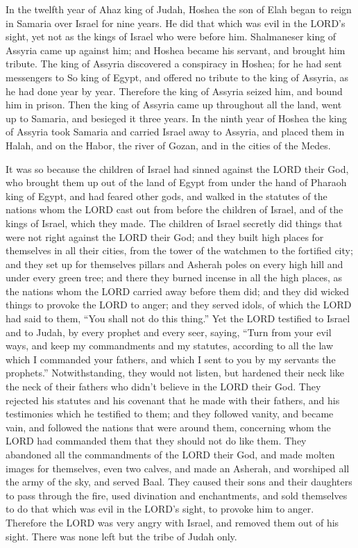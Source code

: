 \mychapter{} \myverse*{}In the twelfth year of Ahaz king of Judah, Hoshea the son of Elah
began to reign in Samaria over Israel for nine years.
\myverse{}He did that which was evil in the LORD’s sight, yet not as the kings of Israel
who were before him.
\myverse{}Shalmaneser king of Assyria came up against him; and Hoshea became his servant,
and brought him tribute.
\myverse{}The king of Assyria discovered a conspiracy in Hoshea; for he had sent messengers
to So king of Egypt, and offered no tribute to the king of Assyria, as he had done year by year. Therefore
the king of Assyria seized him, and bound him in prison.
\myverse{}Then the king of Assyria came up throughout all the land, went up to Samaria,
and besieged it three years.
\myverse{}In the ninth year of Hoshea the king of Assyria took Samaria and carried Israel
away to Assyria, and placed them in Halah, and on the Habor, the river of Gozan, and in the cities of
the Medes.

\myverse{}It was so because the children of Israel had sinned against the
LORD their God, who brought them up out of the land of Egypt from under the hand of Pharaoh king of Egypt,
and had feared other gods,
\myverse{}and walked in the statutes of the nations whom the LORD cast out from before
the children of Israel, and of the kings of Israel, which they made.
\myverse{}The children of Israel secretly did things that were not right against the
LORD their God; and they built high places for themselves in all their cities, from the tower of the watchmen
to the fortified city;
\myverse{}and they set up for themselves pillars and Asherah poles on every high hill
and under every green tree;
\myverse{}and there they burned incense in all the high places, as the nations whom
the LORD carried away before them did; and they did wicked things to provoke the LORD to anger;
\myverse{}and they served idols, of which the LORD had said to them, “You shall not
do this thing.”
\myverse{}Yet the LORD testified to Israel and to Judah, by every prophet and every
seer, saying, “Turn from your evil ways, and keep my commandments and my statutes, according to all the
law which I commanded your fathers, and which I sent to you by my servants the prophets.”
\myverse{}Notwithstanding, they would not listen, but hardened their neck like the
neck of their fathers who didn’t believe in the LORD their God.
\myverse{}They rejected his statutes and his covenant that he made with their fathers,
and his testimonies which he testified to them; and they followed vanity, and became vain, and followed
the nations that were around them, concerning whom the LORD had commanded them that they should not do
like them.
\myverse{}They abandoned all the commandments of the LORD their God, and made molten
images for themselves, even two calves, and made an Asherah, and worshiped all the army of the sky, and
served Baal.
\myverse{}They caused their sons and their daughters to pass through the fire, used
divination and enchantments, and sold themselves to do that which was evil in the LORD’s sight, to provoke
him to anger.
\myverse{}Therefore the LORD was very angry with Israel, and removed them out of his
sight. There was none left but the tribe of Judah only.

